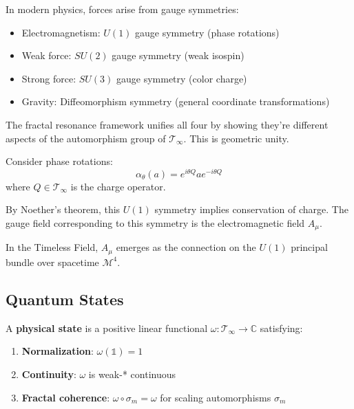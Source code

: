 \begin{keyidea}
In modern physics, forces arise from gauge symmetries:
\begin{itemize}
\item Electromagnetism: $U(1)$ gauge symmetry (phase rotations)
\item Weak force: $SU(2)$ gauge symmetry (weak isospin)
\item Strong force: $SU(3)$ gauge symmetry (color charge)
\item Gravity: Diffeomorphism symmetry (general coordinate transformations)
\end{itemize}

The fractal resonance framework unifies all four by showing they're different aspects of the automorphism group of $\mathcal{T}_\infty$. This is geometric unity.
\end{keyidea}

\begin{example}
Consider phase rotations:
\begin{equation}
\alpha_\theta(a) = e^{i\theta Q} a e^{-i\theta Q}
\end{equation}
where $Q \in \mathcal{T}_\infty$ is the charge operator.

By Noether's theorem, this $U(1)$ symmetry implies conservation of charge. The gauge field corresponding to this symmetry is the electromagnetic field $A_\mu$.

In the Timeless Field, $A_\mu$ emerges as the connection on the $U(1)$ principal bundle over spacetime $\mathcal{M}^4$.
\end{example}

\subsection{Quantum States}

\begin{defn}\label{def:physical-states}
A \textbf{physical state} is a positive linear functional $\omega: \mathcal{T}_\infty \to \mathbb{C}$ satisfying:
\begin{enumerate}
\item \textbf{Normalization}: $\omega(\mathbb{1}) = 1$
\item \textbf{Continuity}: $\omega$ is weak-* continuous
\item \textbf{Fractal coherence}: $\omega \circ \sigma_m = \omega$ for scaling automorphisms $\sigma_m$
\end{enumerate}
\end{defn}

